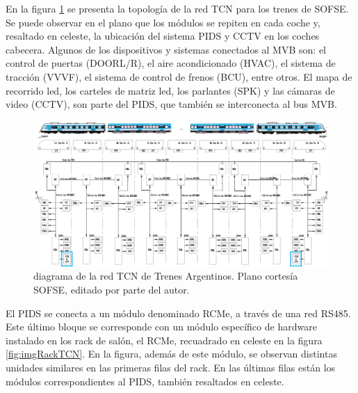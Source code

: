 En la figura \ref{fig:sofseTCN} se presenta la topología de la red TCN para los trenes de SOFSE. Se puede observar en el plano que los módulos se repiten en cada coche y, resaltado en celeste, la ubicación del sistema PIDS y CCTV en los coches cabecera. Algunos de los dispositivos y sistemas conectados al MVB son: el control de puertas (DOORL/R), el aire acondicionado (HVAC), el sistema de tracción (VVVF), el sistema de control de frenos (BCU), entre otros. El mapa de recorrido led, los carteles de matriz led, los parlantes (SPK) y las cámaras de video (CCTV), son parte del PIDS, que también se interconecta al bus MVB. 

\begin{figure}[hh]
	\includegraphics[width=1.75\textwidth, angle=90]{./Figures/diagramaTrenesArgentinosTCN2.png}
	\caption{diagrama de la red TCN de Trenes Argentinos. Plano cortesía SOFSE, editado por parte del autor.}
	\label{fig:sofseTCN}
\end{figure}

El PIDS se conecta a un módulo denominado RCMe, a través de una red RS485. Este último bloque se corresponde con un módulo específico de hardware instalado en los rack de salón, el RCMe, recuadrado en celeste en la figura \ref{fig:imgRackTCN}. En la figura, además de este módulo, se observan distintas unidades similares en las primeras filas del rack. En las últimas filas están los módulos correspondientes al PIDS, también resaltados en celeste.  \\

